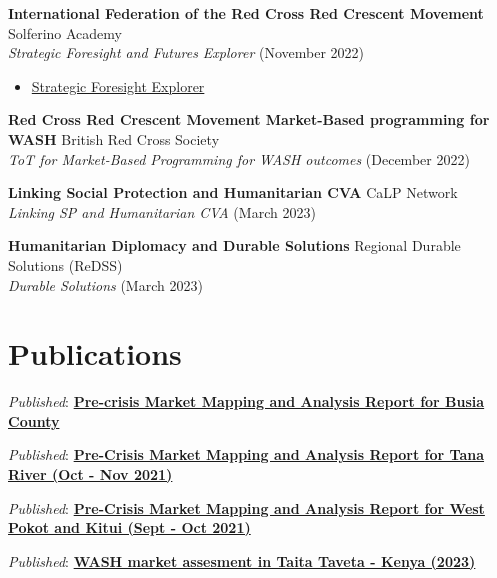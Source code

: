 \documentclass[line,margin,10pt]{res}
\begin{document}
\begin{resume}
\textbf{International Federation of the Red Cross Red Crescent Movement} \hfill Solferino Academy\\
{\sl Strategic Foresight and Futures Explorer} \hfill (November 2022)
\begin{itemize} \itemsep -2pt
    \item \href{https://www.virtualbadge.io/certificate-validator?credential=cer-433e718d-cb4c-4c07-9436-1bbb67b6}{Strategic Foresight Explorer}
\end{itemize}
\textbf{Red Cross Red Crescent Movement Market-Based programming for WASH} \hfill British Red Cross Society\\
{\sl ToT for Market-Based Programming for WASH outcomes} \hfill (December 2022)

\textbf{Linking Social Protection and Humanitarian CVA } \hfill CaLP Network\\
{\sl Linking SP and Humanitarian CVA} \hfill (March 2023)

\textbf{Humanitarian Diplomacy and Durable Solutions} \hfill Regional Durable Solutions (ReDSS)\\
{\sl Durable Solutions} \hfill (March 2023)

{\vspace{-0.25cm}}

\section{Publications}
{\sl Published}: \textbf{\href{https://reliefweb.int/node/3935263}{Pre-crisis Market Mapping and Analysis Report for Busia County}}

{\sl Published}: \textbf{\href{https://reliefweb.int/node/3928348}{Pre-Crisis Market Mapping and Analysis Report for Tana River (Oct - Nov 2021)}}

{\sl Published}: \textbf{\href{https://reliefweb.int/node/3928350}{Pre-Crisis Market Mapping and Analysis Report for West Pokot and Kitui (Sept - Oct 2021)}}

{\sl Published}: \textbf{\href{https://www.dropbox.com/s/qs9067pr9a9tok1/2023_WASH Market assessment Taveta report_final.pdf?dl=0}{WASH market assesment in Taita Taveta - Kenya (2023)}}

{\vspace{-0.25cm}}


\end{resume}
\end{document}
